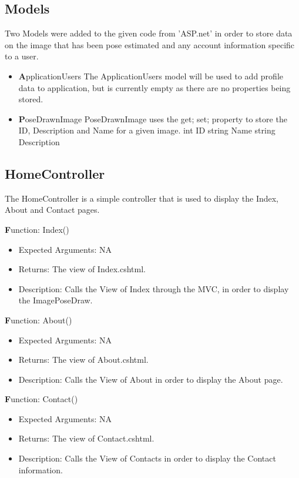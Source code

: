 \documentclass{scrreprt}
\begin{document}
\subsection{Models}
Two Models were added to the given code from 'ASP.net' in order to store data on the image that has been pose estimated and any account information specific to a user.

    \begin{itemize}
      \item \textbf  ApplicationUsers
      The ApplicationUsers model will be used to add profile data to application, but is currently empty as there are no properties being stored.

      \item \textbf  PoseDrawnImage
      PoseDrawnImage uses the {get; set;} property to store the ID, Description and Name for a given image.
        int ID
        string Name
        string Description

    \end{itemize}

\subsection{HomeController}
The HomeController is a simple controller that is used to display the Index, About and Contact pages.

  \textbf Function: Index()
  \begin{itemize}
    \item Expected Arguments:
    NA
    \item Returns:
    The view of Index.cshtml.
    \item Description:
    Calls the View of Index through the MVC, in order to display the ImagePoseDraw.
  \end{itemize}

  \textbf Function: About()
  \begin{itemize}
    \item Expected Arguments:
    NA
    \item Returns:
    The view of About.cshtml.
    \item Description:
    Calls the View of About in order to display the About page.
  \end{itemize}

  \textbf Function: Contact()
  \begin{itemize}
    \item Expected Arguments:
    NA
    \item Returns:
    The view of Contact.cshtml.
    \item Description:
    Calls the View of Contacts in order to display the Contact information.
  \end{itemize}
\end{document}
